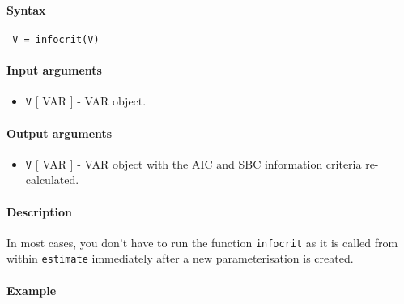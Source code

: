 


	\paragraph{Syntax}
 
 \begin{verbatim}
 V = infocrit(V)
 \end{verbatim}
 
 \paragraph{Input arguments}
 
 \begin{itemize}
 \item
   \texttt{V} {[} VAR {]} - VAR object.
 \end{itemize}
 
 \paragraph{Output arguments}
 
 \begin{itemize}
 \item
   \texttt{V} {[} VAR {]} - VAR object with the AIC and SBC information
   criteria re-calculated.
 \end{itemize}
 
 \paragraph{Description}
 
 In most cases, you don't have to run the function \texttt{infocrit} as
 it is called from within \texttt{estimate} immediately after a new
 parameterisation is created.
 
 \paragraph{Example}


